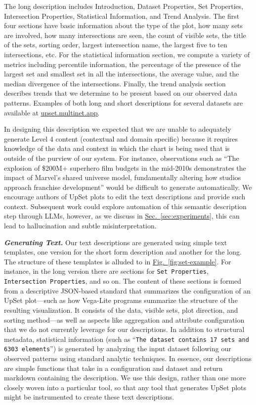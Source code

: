\documentclass{egpubl}
\newcommand\asLink[2]{\textcolor{linkColor}{\href{#1}{\ul{#2}}}}
\newcommand{\secref}[1]{\hyperref[#1]{Sec.~\ref*{#1}}}
\newcommand{\figref}[1]{\hyperref[#1]{Fig.~\ref*{#1}}}
\newcommand{\parahead}[1]
{\vspace{0.25em}\noindent \textbf{\textit{#1.}}}
\begin{document}
The long description includes Introduction, Dataset Properties, Set Properties, Intersection Properties, Statistical Information, and Trend Analysis. The first four sections have basic information about the type of the plot, how many sets are involved, how many intersections are seen, the count of visible sets, the title of the sets, sorting order, largest intersection name, the largest five to ten intersections, etc. For the statistical information section, we compute a variety of metrics including percentile information, the percentage of the presence of the largest set and smallest set in all the intersections, the average value, and the median divergence of the intersections.
Finally, the trend analysis section describes trends that we determine to be present based on our observed data patterns. Examples of both long and short descriptions for several datasets are available at \asLink{https://upset.multinet.app/}{upset.multinet.app}.

In designing this description we expected that we are unable to adequately generate Level 4 content (contextual and domain specific) because it requires knowledge of the data and context in which the chart is being used that is outside of the purview of our system.
For instance, observations such as ``The explosion of \$200M+ superhero film budgets in the mid-2010s demonstrates the impact of Marvel's shared universe model, fundamentally altering how studios approach franchise development'' would be difficult to generate automatically.
We encourage authors of UpSet plots to edit the text descriptions and provide such context.
Subsequent work could explore automation of this semantic description step through LLMs, however, as we discuss in \secref{sec:experiments}, this can lead to hallucination and subtle misinterpretation.

\parahead{Generating Text}
Our text descriptions are generated using simple text templates, one version for the short form description and another for the long.
The structure of these templates is alluded to in \figref{fig:set-example}. For instance, in the long version there are sections for \texttt{Set Properties}, \texttt{Intersection Properties}, and so on.
The content of these sections is formed from a descriptive JSON-based standard that summarizes the configuration of an UpSet plot---such as how Vega-Lite programs summarize the structure of the resulting visualization.
It consists of the data, visible sets, plot direction, and sorting method---as well as aspects like aggregation and attribute configuration that we do not currently leverage for our descriptions.
In addition to structural metadata, statistical information (such as ``\texttt{The dataset contains 17 sets and 6303 elements}'') is generated by analyzing the input dataset following our observed patterns using standard analytic techniques.
In essence, our descriptions are simple functions that take in a configuration and dataset and return markdown containing the description.
We use this design, rather than one more closely woven into a particular tool, so that any tool that generates UpSet plots might be instrumented to create these text descriptions.
\end{document}
